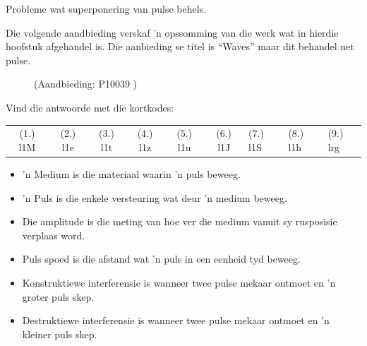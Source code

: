 \begin{exercises}{Probleme wat superponering van pulse behels.}
\label{m38802*fs-id1165499443114} Die volgende aandbieding verskaf 'n opssomming van die werk wat in hierdie hoofstuk afgehandel is. Die aanbieding se titel is ``Waves'' maar dit behandel net pulse. 
    \setcounter{subfigure}{0}
	\begin{figure}[H] %
    \label{m38802*slidesharemedia}\label{m38802*slideshareflash} { (Aandbieding:  P10039 )}
      \vspace{2pt}
    \vspace{.1in}
 \end{figure}       
\par 
  \label{m38802*eip-812}
\par {} Vind die antwoorde met die kortkodes:
 \par \begin{tabular}[h]{cccccc}
 (1.) l1M  &  (2.) l1e  &  (3.) l1t  &  (4.) l1z  &  (5.) l1u  &  (6.) l1J  &  (7.) l1S  &  (8.) l1h  &  (9.) lrg  & \end{tabular}

\end{exercises}
            \summary
            \nopagebreak
            \label{m38802*eip-404}\begin{itemize}[noitemsep]
            \item 'n Medium is die materiaal waarin 'n puls beweeg.
	    \item 'n Puls is die enkele versteuring wat deur 'n medium beweeg. 
	    \item Die amplitude is die meting van hoe ver die medium vanuit sy rusposisie verplaas word. 
	    \item Puls spoed is die afstand wat 'n puls in een eenheid tyd beweeg.
	    \item Konstruktiewe interferensie is wanneer twee pulse mekaar ontmoet en 'n groter puls skep.
	    \item Destruktiewe interferensie is wanneer twee pulse mekaar ontmoet en 'n kleiner puls skep.
	    \end{itemize}
